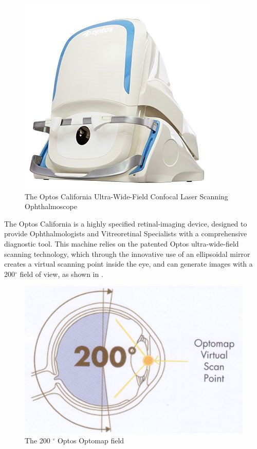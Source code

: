 \begin{figure}[htbp]
\centering
\includegraphics{figures/california}
\caption{The Optos California Ultra-Wide-Field Confocal Laser Scanning Ophthalmoscope}
\label{fig:cali}
   \end{figure}


The Optos California is a highly specified retinal-imaging device, designed to
provide Ophthalmologists and Vitreoretinal Specialists with a comprehensive
diagnostic tool. This machine relies on the patented Optos ultra-wide-field
scanning technology, which through the innovative use of an ellipsoidal mirror
creates a virtual scanning point inside the eye, and can generate images with
a 200$^\circ$ field of view, as shown in .

\begin{figure}[htbp]
\centering
\includegraphics{figures/optoswide}
\caption{The 200 $^\circ$ Optos Optomap field}
\label{fig:wideview}
   \end{figure}

